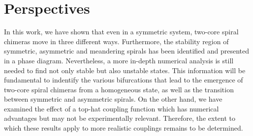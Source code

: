 

\section{Perspectives}
 

In this work, we have shown that even in a symmetric system, two-core
spiral chimeras move in three different ways. Furthermore, the stability region of symmetric, 
asymmetric and meandering spirals has been identified and presented in a phase diagram.
Nevertheless, a more in-depth numerical analysis is still needed to find not only
stable but also unstable states. This information will be fundamental to indentify
the various bifurcations that lead to the emergence of two-core spiral chimeras
from a homogeneous state, as well as the transition between symmetric and asymmetric
spirals. On the other hand, we have examined the effect of a top-hat coupling function
which has numerical advantages but may not be experimentally relevant. Therefore,
the extent to which these results apply to more realistic couplings remains
to be determined.